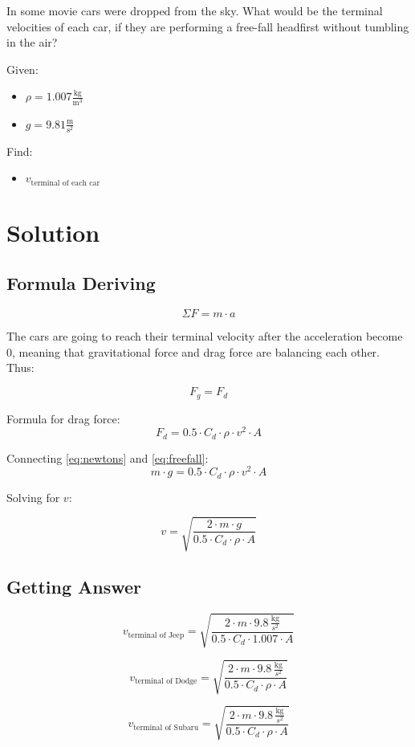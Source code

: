
In some movie cars were dropped from the sky.
What would be the terminal velocities of each car, if they are
performing a free-fall headfirst without tumbling in the air?

\bigbreak Given:
\begin{itemize}
    \item $ \rho = 1.007 \frac{\text{kg}}{\text{m}^3} $
    \item $ g = 9.81 \frac{\text{m}}{\text{s}^2} $
\end{itemize}

Find:
\begin{itemize}
    \item $ v_{\text{terminal of each car}} $
\end{itemize}


\section*{Solution}
\subsection*{Formula Deriving}

\begin{equation}
    \label{eq:newtons}
    \Sigma F = m \cdot a
\end{equation}

The cars are going to reach their terminal velocity after the acceleration become 0,
meaning that gravitational force and drag force are balancing each other. Thus:

$$ F_g = F_d $$

Formula for drag force:
\begin{equation}
    \label{eq:freefall}
    F_d = 0.5 \cdot C_d \cdot \rho \cdot v^2 \cdot A
\end{equation}

Connecting \ref{eq:newtons} and \ref{eq:freefall}:
$$m \cdot g = 0.5 \cdot C_d \cdot \rho \cdot v^2 \cdot A $$

Solving for $v$:

\begin{equation}
    \label{eq:terminal}
    v = \sqrt{\frac{2 \cdot m \cdot g}{0.5 \cdot C_d \cdot \rho \cdot A}}
\end{equation}

\subsection*{Getting Answer}

$$ v_{\text{terminal of Jeep}} = \sqrt{\frac{2 \cdot m \cdot 9.8 \, \frac{\text{kg}}{s^2}}{0.5 \cdot C_d \cdot 1.007  \cdot A}} $$

$$ v_{\text{terminal of Dodge}} = \sqrt{\frac{2 \cdot m \cdot 9.8 \, \frac{\text{kg}}{s^2}}{0.5 \cdot C_d \cdot \rho \cdot A}} $$

$$ v_{\text{terminal of Subaru}} = \sqrt{\frac{2 \cdot m \cdot 9.8 \, \frac{\text{kg}}{s^2}}{0.5 \cdot C_d \cdot \rho \cdot A}} $$